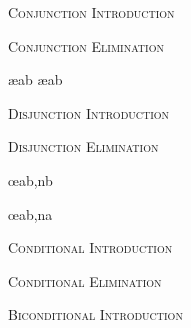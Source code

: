 \label{nd-proofrules}


\textsc{Conjunction Introduction}

\begin{ndproof}
	 
\end{ndproof}

\textsc{Conjunction Elimination}

\begin{ndproof}
	 \ae{ab}
	 \ae{ab}
\end{ndproof}


\textsc{Disjunction Introduction}

\begin{ndproof}
\end{ndproof}

\textsc{Disjunction Elimination}

\begin{ndproof}
	 \oe{ab,nb}
\end{ndproof}

\begin{ndproof}
	 \oe{ab,na}
\end{ndproof}


\textsc{Conditional Introduction}

\nopagebreak
\begin{ndproof}
	\open
		 
	\close
\end{ndproof}

\pagebreak
\textsc{Conditional Elimination}

\begin{ndproof}
	 
\end{ndproof}

\textsc{Biconditional Introduction}

\begin{ndproof}
	 
\end{ndproof}

